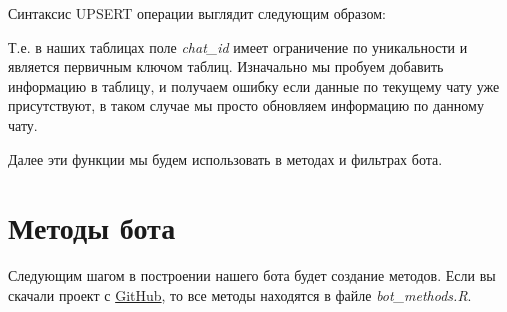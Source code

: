 \documentclass[
]{book}
\newenvironment{Shaded}{\begin{snugshade}}{\end{snugshade}}
\newcommand{\KeywordTok}[1]{\textcolor[rgb]{0.13,0.29,0.53}{\textbf{#1}}}
\newcommand{\NormalTok}[1]{#1}
\newcommand{\OperatorTok}[1]{\textcolor[rgb]{0.81,0.36,0.00}{\textbf{#1}}}
\newcommand{\StringTok}[1]{\textcolor[rgb]{0.31,0.60,0.02}{#1}}
\begin{document}
Синтаксис UPSERT операции выглядит следующим образом:

\begin{Shaded}
\end{Shaded}

Т.е. в наших таблицах поле \emph{chat\_id} имеет ограничение по уникальности и является первичным ключом таблиц. Изначально мы пробуем добавить информацию в таблицу, и получаем ошибку если данные по текущему чату уже присутствуют, в таком случае мы просто обновляем информацию по данному чату.

Далее эти функции мы будем использовать в методах и фильтрах бота.

\hypertarget{ux43cux435ux442ux43eux434ux44b-ux431ux43eux442ux430}{%
\section{Методы бота}\label{ux43cux435ux442ux43eux434ux44b-ux431ux43eux442ux430}}

Следующим шагом в построении нашего бота будет создание методов. Если вы скачали проект с \href{https://github.com/selesnow/logical_tg_bot/archive/master.zip}{GitHub}, то все методы находятся в файле \emph{bot\_methods.R}.
\end{document}
